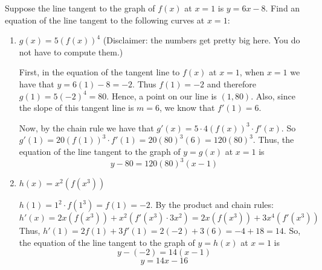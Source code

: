 \documentclass[nooutcomes]{ximera}
\begin{document}
	
	
	
	
	
	
	
			
			

\begin{problem}
Suppose the line tangent to the graph of $f(x)$ at $x=1$ is $y=6x-8$.  Find an equation of the line tangent to the following curves at $x=1$:
	\begin{enumerate}
	
	\item  $g(x) = 5(f(x))^4$  (Disclaimer:  the numbers get pretty big here.  You do not have to compute them.)
		\begin{freeResponse}
		First, in the equation of the tangent line to $f(x)$ at $x=1$, when $x=1$ we have that $y= 6(1) - 8 = -2$.  Thus $f(1) = -2$ and therefore $g(1) = 5(-2)^4 = 80$.  Hence, a point on our line is $(1,80)$.  Also, since the slope of this tangent line is $m=6$, we know that $f'(1) = 6$.
		
		Now, by the chain rule we have that $g'(x) = 5 \cdot 4 (f(x))^3 \cdot f'(x)$.  So $g'(1) = 20(f(1))^3 \cdot f'(1) = 20(80)^3 (6) = 120(80)^3.$  Thus, the equation of the line tangent to the graph of $y = g(x)$ at $x=1$ is
		$$ y - 80 = 120(80)^3(x-1) $$
		\end{freeResponse}
		
		
		
	\item  $h(x) = x^2 (f(x^3))$
		\begin{freeResponse}
		$h(1) = 1^2 \cdot f(1^3) = f(1) = -2$.  By the product and chain rules:
		$$ h'(x) = 2x(f(x^3)) + x^2(f'(x^3) \cdot 3x^2) = 2x(f(x^3)) + 3x^4(f'(x^3)) $$
		Thus, $h'(1) = 2f(1) + 3f'(1) = 2(-2) + 3(6) = -4 + 18 = 14$.  So, the equation of the line tangent to the graph of $y=h(x)$ at $x=1$ is
		$$ y- (-2) = 14(x-1) $$
		$$ y = 14x - 16 $$
		\end{freeResponse}
		
		
		
	\end{enumerate}
		
		
		
	
		
\end{problem}









\begin{problem}
	
	
		\begin{freeResponse}
		
		\end{freeResponse}
		
		
		
	
		
\end{problem}
\end{document}
